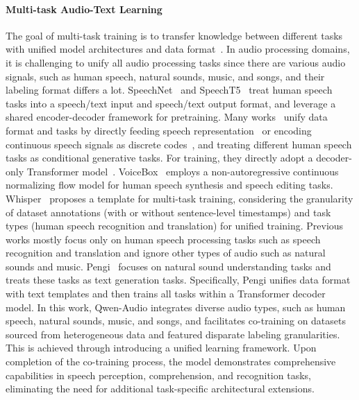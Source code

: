 \documentclass{article}
\begin{document}
\paragraph{Multi-task Audio-Text Learning}
The goal of multi-task training is to transfer knowledge between different tasks with unified model architectures and data format~\citep{raffel2020exploring,ao2021speecht5,chen2021speechnet}. In audio processing domains, it is challenging to unify all audio processing tasks since there are various audio signals, such as human speech, natural sounds, music, and songs, and their labeling format differs a lot. SpeechNet~\citep{chen2021speechnet} and SpeechT5~\citep{ao2021speecht5} treat human speech tasks into a speech/text input and speech/text output format, and leverage a shared encoder-decoder framework for pretraining. Many works~\citep{VIOLA, maiti2023voxtlm, AudioPALM, SpeechX, LMWithVoice} unify data format and tasks by directly feeding speech representation~\citep{LMWithVoice} or encoding continuous speech signals as discrete codes~\citep{Encodec, SoundStream,USM}, and treating different human speech tasks as conditional generative tasks. For training, they directly adopt a decoder-only Transformer model~\citep{Transformer}. VoiceBox~\citep{VoiceBox} employs a non-autoregressive continuous normalizing flow model for human speech synthesis and speech editing tasks. 
Whisper~\citep{Whisper} proposes a template for multi-task training, considering the granularity of dataset annotations (with or without sentence-level timestamps) and task types (human speech recognition and translation) for unified training. Previous works mostly focus only on human speech processing tasks such as speech recognition and translation and ignore other types of audio such as natural sounds and music. Pengi~\citep{Pengi} focuses on natural sound understanding tasks and treats these tasks as text generation tasks. Specifically, Pengi unifies data format with text templates and then trains all tasks within a Transformer decoder model. In this work, Qwen-Audio integrates diverse audio types, such as human speech, natural sounds, music, and songs, and facilitates co-training on datasets sourced from heterogeneous data and featured disparate labeling granularities. This is achieved through introducing a unified learning framework. Upon completion of the co-training process, the model demonstrates comprehensive capabilities in speech perception, comprehension, and recognition tasks, eliminating the need for additional task-specific architectural extensions.
\end{document}
